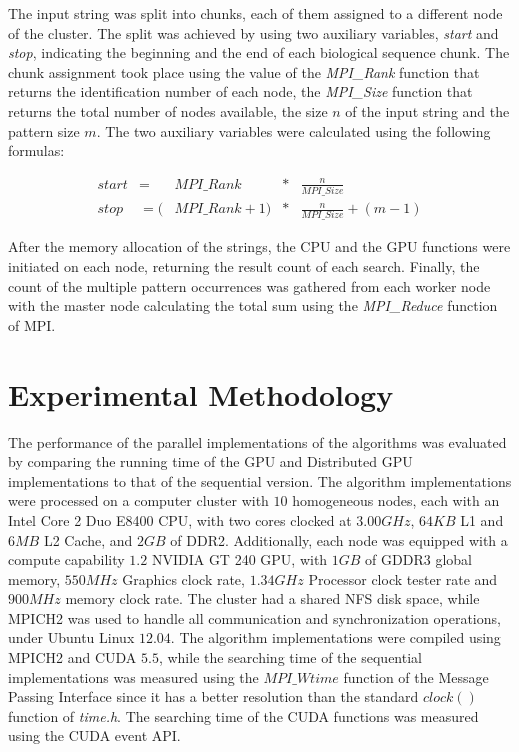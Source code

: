 \documentclass{ws-ijait}
\begin{document}
The input string was split into chunks, each of them assigned to a different node of the cluster. The split was achieved by using two auxiliary variables, \textit{start} and \textit{stop}, indicating the beginning and the end of each biological sequence chunk. The chunk assignment took place using the value of the \textit{MPI\_Rank} function that returns the identification number of each node, the \textit{MPI\_Size} function that returns the total number of nodes available, the size $n$ of the input string and the pattern size $m$. The two auxiliary variables were calculated using the following formulas:

\begin{equation}
\begin{array} {lllll} 
\displaystyle start & = & MPI\_Rank & * & \frac{n}{MPI\_Size}\\
\displaystyle stop & = (& MPI\_Rank+1) & * & \frac{n}{MPI\_Size} + (m-1)
\end{array}
\label{eq:chunk-assignments}
\end{equation}

After the memory allocation of the strings, the CPU and the GPU functions were initiated on each node, returning the result count of each search. Finally, the count of the multiple pattern occurrences was gathered from each worker node with the master node calculating the total sum using the \textit{MPI\_Reduce} function of MPI.

\section{Experimental Methodology}
\label{sec:experimental-methodology}

The performance of the parallel implementations of the algorithms was evaluated by comparing the running time of the GPU and Distributed GPU implementations to that of the sequential version. The algorithm implementations were processed on a computer cluster with $10$ homogeneous nodes, each with an Intel Core 2 Duo E8400 CPU, with two cores clocked at $3.00GHz$, $64KB$ L1 and $6MB$ L2 Cache, and $2GB$ of DDR2. Additionally, each node was equipped with a compute capability $1.2$ NVIDIA GT 240 GPU, with $1GB$ of GDDR3 global memory, $550MHz$ Graphics clock rate, $1.34GHz$ Processor clock tester rate and $900MHz$ memory clock rate. The cluster had a shared NFS disk space, while MPICH2 was used to handle all communication and synchronization operations, under Ubuntu Linux $12.04$. The algorithm implementations were compiled using MPICH2 and CUDA $5.5$, while the searching time of the sequential implementations was measured using the $MPI\_Wtime$ function of the Message Passing Interface since it has a better resolution than the standard $clock()$ function of \textit{time.h}. The searching time of the CUDA functions was measured using the CUDA event API.
\end{document}
